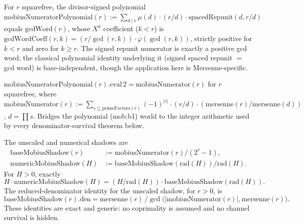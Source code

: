 \begin{prop}
For $r$ squarefree, the divisor-signed polynomial $\mathrm{mobiusNumeratorPolynomial}(r) := \sum_{d\mid r} \mu(d)\cdot(r/d)\cdot\mathrm{spacedRepunit}(d,r/d)$ equals $\mathrm{gcdWord}(r)$, whose $X^k$ coefficient ($k<r$) is $\mathrm{gcdWordCoeff}(r,k) = (r/\gcd(r,k))\cdot\varphi(\gcd(r,k))$, strictly positive for $k<r$ and zero for $k\ge r$. The signed repunit numerator is exactly a positive gcd word; the classical polynomial identity underlying it (signed spaced repunit $=$ gcd word) is base-independent, though the application here is Mersenne-specific.
\par\noindent{}     
\end{prop}

\begin{prop}
$\mathrm{mobiusNumeratorPolynomial}(r).\mathrm{eval}\,2 = \mathrm{mobiusNumerator}(r)$ for $r$ squarefree, where $\mathrm{mobiusNumerator}(r) := \sum_{s \subseteq \mathrm{primeFactors}(r)} (-1)^{|s|}\cdot(r/d)\cdot(\mathrm{mersenne}(r)/\mathrm{mersenne}(d))$, $d = \prod s$. Bridges the polynomial (mob:b1) world to the integer arithmetic used by every denominator-survival theorem below.
\par\noindent{}    
\end{prop}

\begin{prop}
The unscaled and numerical shadows are
\[
\begin{aligned}
\mathrm{baseMobiusShadow}(r)
  &:= \mathrm{mobiusNumerator}(r)/(2^r-1), \\
\mathrm{numericMobiusShadow}(H)
  &:= \mathrm{baseMobiusShadow}(\mathrm{rad}(H))/\mathrm{rad}(H).
\end{aligned}
\]
For $H>0$, exactly
\[
H\cdot\mathrm{numericMobiusShadow}(H)
 = (H/\mathrm{rad}(H))\cdot
   \mathrm{baseMobiusShadow}(\mathrm{rad}(H)).
\]
The reduced-denominator identity for the unscaled shadow, for $r>0$, is
\[
\mathrm{baseMobiusShadow}(r).\mathrm{den}
 = \mathrm{mersenne}(r)\,\Big/
   \gcd\bigl(|\mathrm{mobiusNumerator}(r)|,\mathrm{mersenne}(r)\bigr).
\]
These identities are exact and generic: no coprimality is assumed and no channel survival is hidden.
\par\noindent{}    
\end{prop}

